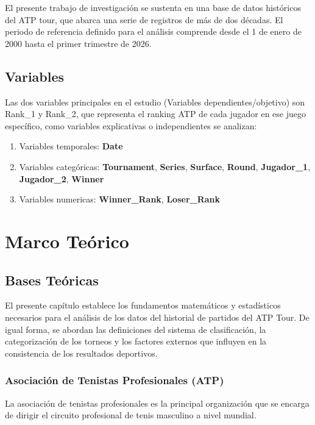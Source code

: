 \documentclass[oneside,11pt]{Latex/Classes/PhDthesisPSnPDF}
\begin{document}
El presente trabajo de investigación se sustenta en una base de datos
históricos del ATP tour, que abarca una serie de registros de más de dos
décadas. El periodo de referencia definido para el análisis comprende
desde el 1 de enero de 2000 hasta el primer trimestre de 2026.

\section{Variables}

Las dos variables principales en el estudio (Variables
dependientes/objetivo) son Rank\_1 y Rank\_2, que representa el ranking
ATP de cada jugador en ese juego específico, como variables explicativas
o independientes se analizan:

\begin{enumerate}
  \item Variables temporales: \textbf{Date}
  \item Variables categóricas: \textbf{Tournament}, \textbf{Series}, \textbf{Surface}, \textbf{Round},             \textbf{Jugador\_1}, \textbf {Jugador\_2}, \textbf{Winner}
  \item Variables numericas: \textbf{Winner\_Rank}, \textbf{Loser\_Rank}
\end{enumerate}

\chapter{Marco Teórico}

\section{Bases Teóricas}

El presente capítulo establece los fundamentos matemáticos y
estadísticos necesarios para el análisis de los datos del historial de
partidos del ATP Tour. De igual forma, se abordan las definiciones del
sistema de clasificación, la categorización de los torneos y los
factores externos que influyen en la consistencia de los resultados
deportivos.\\

\subsection{Asociación de Tenistas Profesionales (ATP)}

La asociación de tenistas profesionales es la principal organización que
se encarga de dirigir el circuito profesional de tenis masculino a nivel
mundial.\\
\end{document}

